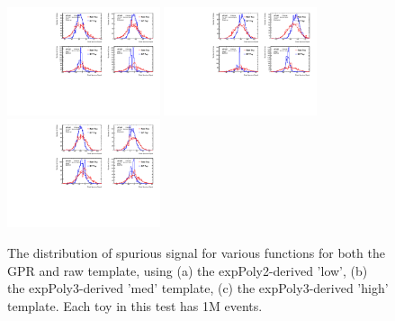 \begin{figure} 
\begin{center}
  \includegraphics[width=0.4\textwidth]{figures/background/gpr/validation/nominal/ToyTest_FitSigVals_lowpT_1M_noSig}   
  \includegraphics[width=0.4\textwidth]{figures/background/gpr/validation/nominal/ToyTest_FitSigVals_medpT_1M_noSig}   
  \includegraphics[width=0.4\textwidth]{figures/background/gpr/validation/nominal/ToyTest_FitSigVals_highpT_1M_noSig}   
\caption{The distribution of spurious signal for various functions for both the GPR and raw template, using (a) the expPoly2-derived 'low', (b) the expPoly3-derived 'med' template, (c) the expPoly3-derived 'high' template. Each toy in this test has 1M events.}
\label{fig:lowpt_1M_noSig}
\end{center}
\end{figure}

